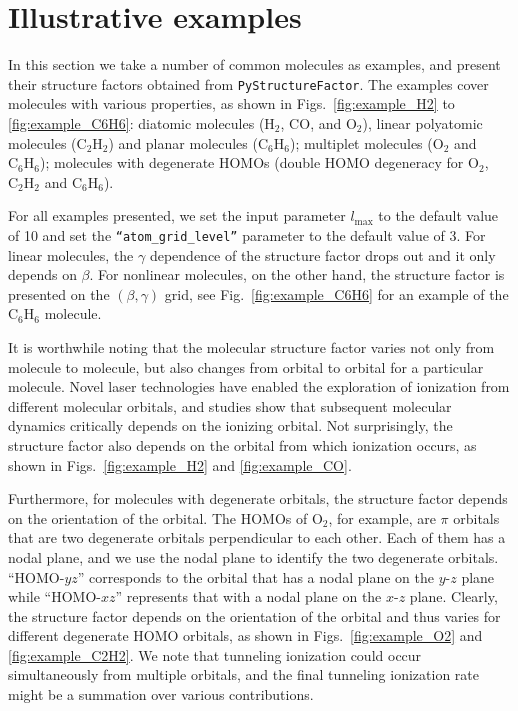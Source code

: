 \documentclass[preprint,12pt]{elsarticle} %
\renewcommand{\rm}[1]{\mathrm{#1}}    %
\begin{document}
\section{Illustrative examples}
\label{sec:example}

In this section we take a number of common molecules as examples, and present their structure factors obtained from \texttt{PyStructureFactor}. The examples cover molecules with various properties, as shown in Figs.~\ref{fig:example_H2} to \ref{fig:example_C6H6}: diatomic molecules ($\rm{H}_2$, $\rm{CO}$, and $\rm{O}_2$), linear polyatomic molecules ($\rm{C}_2\rm{H}_2$) and planar molecules ($\rm{C}_6\rm{H}_6$); multiplet molecules ($\rm{O}_2$ and $\rm{C}_6\rm{H}_6$); molecules with degenerate HOMOs (double HOMO degeneracy for $\rm{O}_2$, $\rm{C}_2\rm{H}_2$ and $\rm{C}_6\rm{H}_6$).

For all examples presented, we set the input parameter $l_{\rm{max}}$ to the default value of 10 and set the \texttt{``atom\_grid\_level''} parameter to the default value of 3.
For linear molecules, the $\gamma$ dependence of the structure factor drops out and it only depends on $\beta$. For nonlinear molecules, on the other hand, the structure factor is presented on the $(\beta,\gamma)$ grid, see Fig.~\ref{fig:example_C6H6} for an example of the $\rm{C}_6\rm{H}_6$ molecule.

It is worthwhile noting that the molecular structure factor varies not only from molecule to molecule, but also changes from orbital to orbital for a particular molecule. Novel laser technologies have enabled the exploration of ionization from different molecular orbitals, and studies show that subsequent molecular dynamics critically depends on the ionizing orbital. Not surprisingly, the structure factor also depends on the orbital from which ionization occurs, as shown in Figs.~\ref{fig:example_H2} and \ref{fig:example_CO}.

Furthermore, for molecules with degenerate orbitals, the structure factor depends on the orientation of the orbital. The HOMOs of $\rm{O}_2$, for example, are $\pi$ orbitals that are two degenerate orbitals perpendicular to each other. Each of them has a nodal plane, and we use the nodal plane to identify the two degenerate orbitals. ``HOMO-$yz$'' corresponds to the orbital that has a nodal plane on the $y$-$z$ plane while ``HOMO-$xz$'' represents that with a nodal plane on the $x$-$z$ plane. Clearly, the structure factor depends on the orientation of the orbital and thus varies for different degenerate HOMO orbitals, as shown in Figs.~\ref{fig:example_O2} and \ref{fig:example_C2H2}. We note that tunneling ionization could occur simultaneously from multiple orbitals, and the final tunneling ionization rate might be a summation over various contributions.
\end{document}
